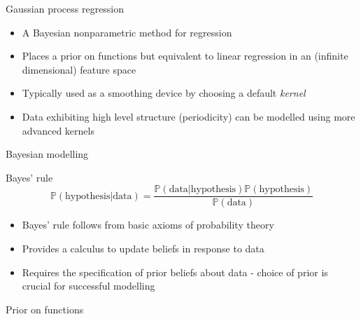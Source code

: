 \begin{frame}{Gaussian process regression}
  \begin{itemize}
    \item A Bayesian nonparametric method for regression
    \vspace{\baselineskip}
    \item Places a prior on functions but equivalent to linear regression in an (infinite dimensional) feature space
    \vspace{\baselineskip}
    \item Typically used as a smoothing device by choosing a default \emph{kernel}
    \vspace{\baselineskip}
    \item Data exhibiting high level structure (\eg periodicity) can be modelled using more advanced kernels
  \end{itemize}
\end{frame}

\begin{frame}{Bayesian modelling}
  \begin{block}{Bayes' rule}
    \begin{equation*}
      \mathbb{P}(\textrm{hypothesis}|\textrm{data}) = \frac{\mathbb{P}(\textrm{data}|\textrm{hypothesis})\mathbb{P}(\textrm{hypothesis})}{\mathbb{P}(\textrm{data})}
    \end{equation*}
  \end{block}
  \begin{block}{}
    \begin{itemize}
      \item Bayes' rule follows from basic axioms of probability theory
      \vspace{\baselineskip}
      \item Provides a calculus to update beliefs in response to data
      \vspace{\baselineskip}
      \item Requires the specification of prior beliefs about data - choice of prior is crucial for successful modelling
    \end{itemize}
  \end{block}
\end{frame}

\begin{frame}{Prior on functions}
  \begin{center}
    
  \end{center}
\end{frame}

